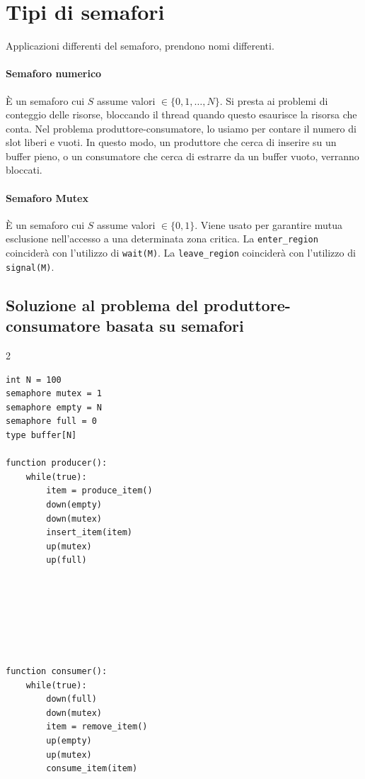 \documentclass{report}
\begin{document}
\section{Tipi di semafori}
Applicazioni differenti del semaforo, prendono nomi differenti. 

\paragraph{Semaforo numerico} È un semaforo cui $S$ assume valori  $\in \{0,1,\dots,N\}$. Si presta ai problemi di conteggio delle risorse, bloccando il thread quando questo esaurisce la risorsa che conta. Nel problema produttore-consumatore, lo usiamo per contare il numero di slot liberi e vuoti. In questo modo, un produttore che cerca di inserire su un buffer pieno, o un consumatore che cerca di estrarre da un buffer vuoto, verranno bloccati.
\paragraph{Semaforo Mutex} È un semaforo cui $S$ assume valori $\in  \{0,1\}$. Viene usato per garantire mutua esclusione nell'accesso a una determinata zona critica.
La \verb|enter_region| coinciderà con l'utilizzo di \verb|wait(M)|. La \verb|leave_region| coinciderà con l'utilizzo di \verb|signal(M)|.

\newpage


\subsection{Soluzione al problema del produttore-consumatore basata su semafori}
\begin{multicols}{2}
\begin{verbatim}
int N = 100
semaphore mutex = 1
semaphore empty = N
semaphore full = 0
type buffer[N]

function producer():
    while(true):
        item = produce_item()
        down(empty)
        down(mutex)
        insert_item(item)
        up(mutex)
        up(full)







function consumer():
    while(true):
        down(full)
        down(mutex)
        item = remove_item()
        up(empty)
        up(mutex)
        consume_item(item)
\end{verbatim}
\end{multicols}
\end{document}
